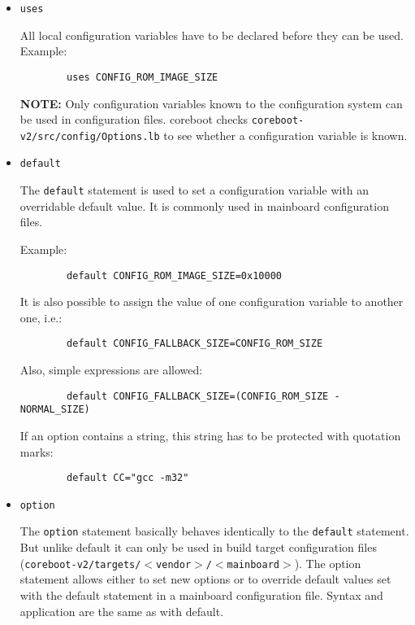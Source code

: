 \documentclass[titlepage,12pt]{article}
\begin{document}
\begin{itemize}

\item \begin{verbatim}uses\end{verbatim}

All local configuration variables have to be declared before they can be
used. Example:
\begin{verbatim}
        uses CONFIG_ROM_IMAGE_SIZE
\end{verbatim}

\textbf{NOTE:} Only configuration variables known to the configuration
system can be used in configuration files. coreboot checks 
\texttt{coreboot-v2/src/config/Options.lb} to see whether a configuration
variable is known.

\item \begin{verbatim}default\end{verbatim}

The \texttt{default} statement is used to set a configuration variable
with an overridable default value. It is commonly used in mainboard
configuration files.  

Example:

\begin{verbatim}
        default CONFIG_ROM_IMAGE_SIZE=0x10000
\end{verbatim}

It is also possible to assign the value of one configuration variable to
another one, i.e.:

\begin{verbatim}
        default CONFIG_FALLBACK_SIZE=CONFIG_ROM_SIZE
\end{verbatim}

Also, simple expressions are allowed:

\begin{verbatim}
        default CONFIG_FALLBACK_SIZE=(CONFIG_ROM_SIZE -  NORMAL_SIZE)
\end{verbatim}

If an option contains a string, this string has to be protected with
quotation marks: 

\begin{verbatim}
        default CC="gcc -m32"
\end{verbatim}

\item \begin{verbatim}option\end{verbatim}

The \texttt{option} statement basically behaves identically to the
\texttt{default} statement. But unlike default it can only be used in
build target configuration files
(\texttt{coreboot-v2/targets/$<$vendor$>$/$<$mainboard$>$}). The option
statement allows either to set new options or to override default values
set with the default statement in a mainboard configuration file.
Syntax and application are the same as with default.

\end{itemize}
\end{document}
